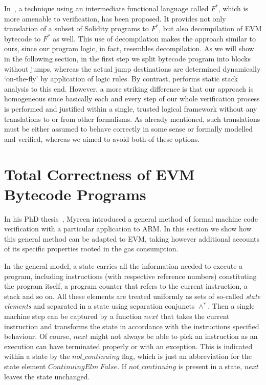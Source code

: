 \documentclass[sigplan,10pt,review]{acmart}\settopmatter{printfolios=true,printccs=false,printacmref=false}
\newcommand{\sconj}{\wedge^*}
\newcommand{\next}{\mathit{next}}
\newcommand{\ncont}{\mathit{not\_continuing}}
\begin{document}
In~\cite{Bhargavan:2016:FVS:2993600.2993611}, a technique using an intermediate functional language
called $F^*$, which is more amenable to verification, has been proposed. 
It provides not only translation of a subset of Solidity programs 
to $F^*$, but also decompilation of EVM bytecode to $F^*$ as well. This use of decompilation makes
the approach similar to ours, since our program logic, in fact, resembles decompilation.
As we will show in the following section, in the first step we split bytecode program into blocks without jumps,  
whereas the actual jump destinations are determined dynamically `on-the-fly' by application of logic rules.
By contrast, \cite{Bhargavan:2016:FVS:2993600.2993611} performs static stack analysis to this end.
However, a more striking difference is that our approach is homogeneous since basically each and every step of our whole verification process 
is performed and justified within a single, trusted logical framework without any translations to or from other formalisms.
As already mentioned, such translations must be either assumed to behave correctly in some sense or 
formally modelled and verified,
whereas we aimed to avoid both of these options. 
%   
\section{Total Correctness of EVM Bytecode Programs}
\label{sec:corr}
In his PhD thesis~\cite{DBLP:phd/ethos/Myreen09}, Myreen introduced a general 
method of formal 
machine code verification with a particular application to ARM. In this section we show how
this general method can be adapted to EVM, taking however additional accounts of its specific properties rooted in the 
gas consumption.
 
In the general model, a state carries all the information needed to execute a program, including
instructions (with respective reference numbers) constituting the program itself, a program counter that
refers to the current instruction, a stack and so on. All these elements are treated uniformly 
as sets of so-called \emph{state elements}
and separated in a state using separation conjuncts $\sconj$.  
Then a single machine step can be captured by a function $\next$ that 
takes the current instruction and transforms the state in accordance with the instructions
specified behaviour. Of course, $\next$ might not always be able to pick an instruction
as an execution can have terminated properly or with an exception. This is indicated within a state
by the $\ncont$ flag, which is just an abbreviation for the state element 
$\mathit{ContinuingElm}\:False$. If $\ncont$ is present in a state, $\next$
leaves the state unchanged.   
   
\end{document}
